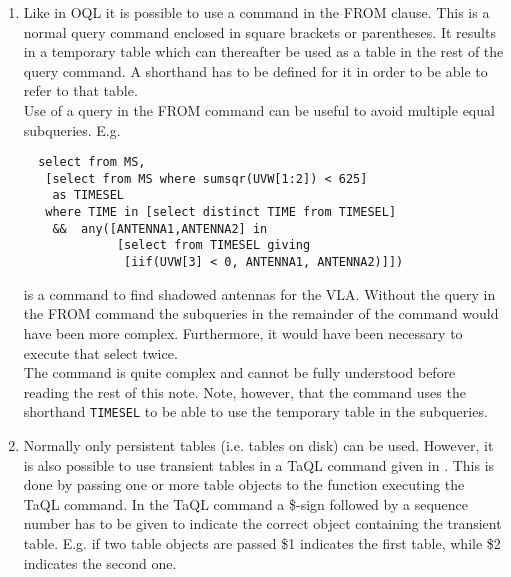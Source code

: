 \begin{description}
\begin{enumerate}
       \item
       Like in OQL it is possible to use a
       command in the FROM clause. This is a normal query command
       enclosed in square brackets or parentheses.
       It results in a temporary table
       which can thereafter be used as a table in the rest of the
       query command. A shorthand has to be defined for it in order
       to be able to refer to that table.
       \\Use of a query in the FROM command can be useful to avoid
       multiple equal subqueries. E.g.
       \begin{verbatim}
  select from MS,
   [select from MS where sumsqr(UVW[1:2]) < 625]
    as TIMESEL
   where TIME in [select distinct TIME from TIMESEL]
    &&  any([ANTENNA1,ANTENNA2] in
             [select from TIMESEL giving
              [iif(UVW[3] < 0, ANTENNA1, ANTENNA2)]])
       \end{verbatim}
       is a command to find shadowed antennas for the VLA.
       Without the query in the FROM command the subqueries in the
       remainder of the command would have been more complex.
       Furthermore, it would have been necessary to execute that
       select twice.
       \\The command is quite complex and cannot be fully understood
       before reading the rest of this note.
       Note, however, that the command uses the shorthand \texttt{TIMESEL}
       to be able to use the temporary table in the subqueries.

       \item
       Normally only persistent tables (i.e. tables on disk) can
       be used. However, it is also possible to use transient tables
       in a TaQL command given in .
       This is done by passing one or more table objects to the
       function executing the TaQL command. In the TaQL command a
       \$-sign followed by a sequence number has to be given to
       indicate the correct object containing the transient table.
       E.g. if two
       table objects are passed \$1 indicates the first table, while \$2
       indicates the second one.
     \end{enumerate}


\end{description}
